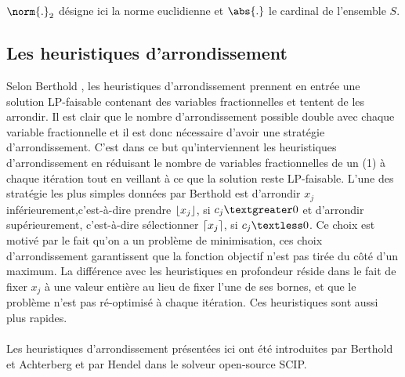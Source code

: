\documentclass[12pt,a4paper,oneside]{book}
\theoremstyle{definition}
\DeclarePairedDelimiter\ceil{\lceil}{\rceil}
\DeclarePairedDelimiter\floor{\lfloor}{\rfloor}
\begin{document}
	$\norm{.}_2$ désigne ici la norme euclidienne et $\abs{.}$ le cardinal de l'ensemble $S$.
	
	
	\paragraph{}
	
	\subsection{Les heuristiques d'arrondissement}
	Selon Berthold \cite{Bertholda}, les heuristiques d'arrondissement prennent en entrée une solution LP-faisable contenant des variables fractionnelles et tentent de les arrondir. Il est clair que le nombre d'arrondissement possible double avec chaque variable fractionnelle \cite{berthold2006} et il est donc nécessaire d'avoir une stratégie d'arrondissement. C'est dans ce but qu'interviennent les heuristiques d'arrondissement en réduisant le nombre de variables fractionnelles de un (1) à chaque itération tout en veillant à ce que la solution reste LP-faisable. L'une des stratégie les plus simples données par Berthold est d'arrondir $x_j$ inférieurement,c'est-à-dire prendre $\floor{x_j}$, si $c_j \textgreater 0$ et d'arrondir supérieurement, c'est-à-dire sélectionner $\ceil{x_j}$, si $c_j \textless 0 $. Ce choix est motivé par le fait qu'on a un problème de minimisation, ces choix d'arrondissement garantissent que la fonction objectif n'est pas tirée du côté d'un maximum. 
	La différence avec les heuristiques en profondeur réside dans le fait de fixer $x_j$ à une valeur entière au lieu de fixer l'une de ses bornes, et que le problème n'est pas ré-optimisé à chaque itération. Ces heuristiques sont aussi plus rapides.
	 
	
	\paragraph{}
	Les heuristiques d'arrondissement présentées ici ont été introduites par Berthold et Achterberg \cite{berthold2006} et par Hendel \cite{Hendel2011} dans le solveur open-source SCIP.
	
\end{document}
